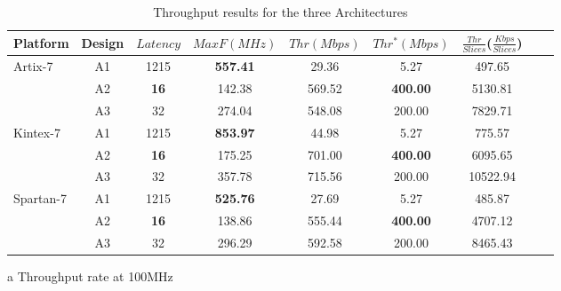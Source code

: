 \documentclass[final,5p,times,twocolumn]{elsarticle}
\begin{document}
\begin{table}
    \begin{threeparttable}
        \caption{Throughput results for the three Architectures}\label{throughput_compare}%
        \begin{tabular*}{\textwidth}{@{\extracolsep\fill}lcccccccc}
            \toprule
            Platform & Design & $Latency$ & $MaxF(MHz)$ & $Thr(Mbps)$ & $Thr^*(Mbps)$\tnote{a} & $\frac{Thr}{Slices}$($\frac{Kbps}{Slices}$) \\
            \midrule
            \multirow{3}{*}{Artix-7}  & A1 & 1215 & \textbf{557.41} & 29.36 & 5.27 & 497.65 \\
            & A2 & \textbf{16} & 142.38 & 569.52 & \textbf{400.00} & 5130.81 \\
            & A3 & 32 & 274.04 & 548.08 & 200.00 & 7829.71 \\
            \midrule
            \multirow{3}{*}{Kintex-7} & A1 & 1215 & \textbf{853.97} & 44.98 & 5.27 & 775.57 \\
            & A2 & \textbf{16} & 175.25 & 701.00 & \textbf{400.00} & 6095.65 \\
            & A3 & 32 & 357.78 & 715.56 & 200.00 & 10522.94 \\
            \midrule
            \multirow{3}{*}{Spartan-7} & A1 & 1215 & \textbf{525.76} & 27.69 & 5.27 & 485.87 \\
            & A2 & \textbf{16} & 138.86 & 555.44 & \textbf{400.00} & 4707.12 \\
            & A3 & 32 & 296.29 & 592.58 & 200.00 & 8465.43 \\
            \bottomrule
        \end{tabular*}
        \begin{tablenotes}
            \item[a] Throughput rate at 100MHz
        \end{tablenotes}
    \end{threeparttable}
\end{table}
\end{document}
